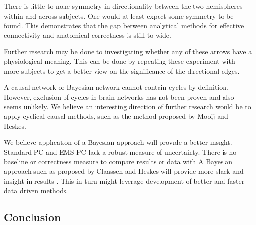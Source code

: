 \documentclass[a4paper, 10pt, english, onecolumn]{article}
\begin{document}
There is little to none symmetry in directionality between the two hemispheres within and across subjects.
One would at least expect some symmetry to be found.
This demonstrates that the gap between analytical methods for effective connectivity and anatomical correctness is still to wide.

Further research may be done to investigating whether any of these arrows have a physiological meaning.
This can be done by repeating these experiment with more subjects to get a better view on the significance of the directional edges.

A causal network or Bayesian network cannot contain cycles by definition.
However, exclusion of cycles in brain networks has not been proven and also seems unlikely.
We believe an interesting direction of further research would be to apply cyclical causal methods, such as the method proposed by Mooij and Heskes\cite{Mooij20013}.

We believe application of a Bayesian approach will provide a better insight.
Standard PC and EMS-PC lack a robust measure of uncertainty.
There is no baseline or correctness measure to compare results or data with
A Bayesian approach such as proposed by Claassen and Heskes will provide more slack and insight in results \cite{claassen2012}.
This in turn might leverage development of better and faster data driven methods.



\subsection{Conclusion}


{}


\appendix
\end{document}

